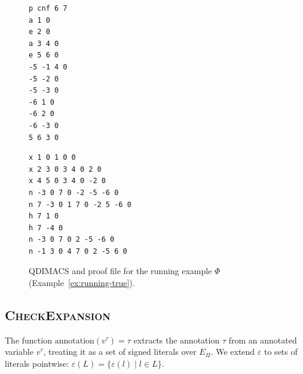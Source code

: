 \documentclass{article}
\begin{document}
\begin{figure}[t]
    \centering
    \begin{minipage}{0.45\columnwidth}
        \begin{mdframed}
            \begin{verbatim}
p cnf 6 7
a 1 0
e 2 0
a 3 4 0
e 5 6 0
-5 -1 4 0
-5 -2 0
-5 -3 0
-6 1 0
-6 2 0
-6 -3 0
5 6 3 0
\end{verbatim}
        \end{mdframed}
    \end{minipage}
    \hfill
    \begin{minipage}{0.45\columnwidth}
        \begin{mdframed}
            \begin{verbatim}
x 1 0 1 0 0
x 2 3 0 3 4 0 2 0
x 4 5 0 3 4 0 -2 0
n -3 0 7 0 -2 -5 -6 0
n 7 -3 0 1 7 0 -2 5 -6 0
h 7 1 0
h 7 -4 0
n -3 0 7 0 2 -5 -6 0
n -1 3 0 4 7 0 2 -5 6 0
\end{verbatim}
        \end{mdframed}
    \end{minipage}
    \caption{QDIMACS and proof file for the running example $\Phi$
        (Example~\ref{ex:running-true}).}
    \label{fig:proof}
\end{figure}

\subsection{\textsc{CheckExpansion}}

The function $\mathrm{annotation}(v^\tau) = \tau$ extracts the annotation $\tau$
from an annotated variable $v^\tau$, treating it as a set of signed literals over
$E_\Pi$. We extend $\varepsilon$ to sets of literals pointwise: $\varepsilon(L) =
    \{\varepsilon(l) \mid l \in L\}$.
\end{document}

